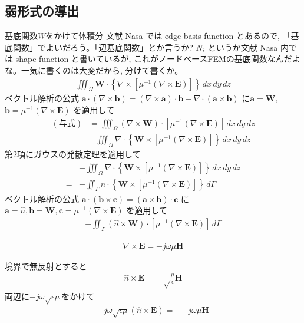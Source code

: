 \subsection{弱形式の導出}

基底関数$W$をかけて体積分
文献 Nasa では edge basis function とあるので,
「基底関数」でよいだろう。「辺基底関数」とか言うか?
$N_i$ というか文献 Nasa 内では shape function と書いているが,
これがノードベースFEMの基底関数なんだよな。一気に書くのは大変だから,
分けて書くか。
\begin{align}
\iiint_\Omega
\bm{W}\cdot\left\{\nabla\times\left[
\mu^{-1}\left(\nabla\times\bm{E}\right)
\right]\right\}\,dx\,dy\,dz
\end{align}
ベクトル解析の公式
$\bm{a}\cdot\left(\nabla\times\bm{b}\right)
=\left(\nabla\times\bm{a}\right)\cdot\bm{b}
-\nabla\cdot\left(\bm{a}\times\bm{b}\right)$
に$\bm{a}=\bm{W}$,
$\bm{b}=\mu^{-1}\left(\nabla\times\bm{E}\right)$
を適用して
\begin{align}
(\textrm{与式})&=
\iiint_\Omega
\left(\nabla\times\bm{W}\right)
\cdot
\left[\mu^{-1}\left(\nabla\times\bm{E}\right)\right]
\,dx\,dy\,dz\\
&-\iiint_\Omega\nabla\cdot
\left\{
\bm{W}
\times
\left[\mu^{-1}
\left(\nabla\times\bm{E}\right)
\right]
\right\}\,dx\,dy\,dz
\end{align}
第2項にガウスの発散定理を適用して
\begin{align}
&-\iiint_{\Omega}\nabla\cdot
\left\{
\bm{W}
\times
\left[
\mu^{-1}\left(\nabla\times\bm{E}\right)
\right]
\right\}
\,dx\,dy\,dz\\
=&-\iint_\Gamma
\hat{n}\cdot
\left\{
\bm{W}
\times
\left[
\mu^{-1}\left(\nabla\times\bm{E}\right)
\right]
\right\}
\,d\Gamma
\end{align}
ベクトル解析の公式
$\bm{a}\cdot\left(\bm{b}\times\bm{c}\right)
=\left(\bm{a}\times\bm{b}\right)\cdot\bm{c}$
に
$\bm{a}=\hat{n},
 \bm{b}=\bm{W},
 \bm{c}=\mu^{-1}\left(\nabla\times\bm{E}\right)$
を適用して
\begin{align}
-\iint_\Gamma
\left(\hat{n}\times\bm{W}\right)\cdot
\left[\mu^{-1}\left(\nabla\times\bm{E}\right)
\right]\,d\Gamma
\end{align}

\begin{align}
\nabla\times\bm{E}=-j\omega\mu\bm{H}
\end{align}

境界で無反射とすると
\begin{align}
\hat{n}\times\bm{E}=&\sqrt\frac{\mu}{\epsilon}\bm{H}
\end{align}
両辺に$-j\omega\sqrt{\epsilon\mu}$をかけて
\begin{align}
-j\omega\sqrt{\epsilon\mu}\left(\hat{n}\times\bm{E}\right)=&-j\omega\mu\bm{H}
\end{align}

